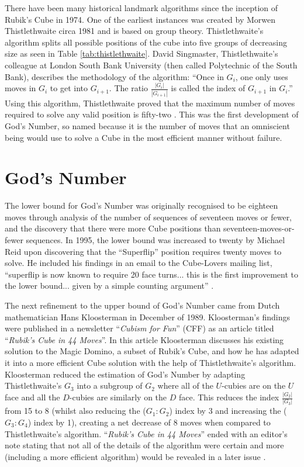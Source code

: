 \documentclass{report}
\newcommand{\tit}[1]{\textit{#1}}
\newcommand{\propernoun}[1]{\enquote{\tit{#1}}}
\begin{document}
    There have been many historical landmark algorithms since the inception of Rubik's Cube in 1974. One of the earliest instances was created by Morwen Thistlethwaite circa 1981 and is based on group theory. Thistlethwaite's algorithm splits all possible positions of the cube into five groups of decreasing size as seen in Table \ref{tab:thistlethwaite}. David Singmaster, Thistlethwaite's colleague at London South Bank University (then called Polytechnic of the South Bank), describes the methodology of the algorithm: \enquote{Once in $G_i$, one only uses moves in $G_i$ to get into $G_{i+1}$. The ratio $\frac{|G_i|}{|G_{i+1}|}$ is called the index of $G_{i+1}$ in $G_i$.} Using this algorithm, Thistlethwaite proved that the maximum number of moves required to solve any valid position is fifty-two \cite{Singmaster1981}. This was the first development of God's Number, so named because it is the number of moves that an omniscient being would use to solve a Cube in the most efficient manner without failure.
    
    \section{God's Number}
    The lower bound for God's Number was originally recognised to be eighteen moves through analysis of the number of sequences of seventeen moves or fewer, and the discovery that there were more Cube positions than seventeen-moves-or-fewer sequences. In 1995, the lower bound was increased to twenty by Michael Reid upon discovering that the \enquote{Superflip} position requires twenty moves to solve. He included his findings in an email to the Cube-Lovers mailing list, \enquote{superflip is now known to require 20 face turns... this is the first improvement to the lower bound... given by a simple counting argument} \cite{Reid1995}.
    
    The next refinement to the upper bound of God's Number came from Dutch mathematician Hans Kloosterman in December of 1989. Kloosterman's findings were published in a newsletter \propernoun{Cubism for Fun} (CFF) as an article titled \propernoun{Rubik's Cube in 44 Moves}. In this article Kloosterman discusses his existing solution to the Magic Domino, a subset of Rubik's Cube, and how he has adapted it into a more efficient Cube solution with the help of Thistlethwaite's algorithm. Kloosterman reduced the estimation of God's Number by adapting Thistlethwaite's $G_3$ into a subgroup of $G_2$ where all of the $U$-cubies are on the $U$ face and all the $D$-cubies are similarly on the $D$ face. This reduces the index $\frac{|G_2|}{|G_3|}$ from 15 to 8 (whilst also reducing the ($G_1:G_2$) index by 3 and increasing the ($G_3:G_4$) index by 1), creating a net decrease of 8 moves when compared to Thistlethwaite's algorithm. \propernoun{Rubik's Cube in 44 Moves} ended with an editor's note stating that not all of the details of the algorithm were certain and more (including a more efficient algorithm) would be revealed in a later issue \cite{Kloosterman1989}.
    
\end{document}
